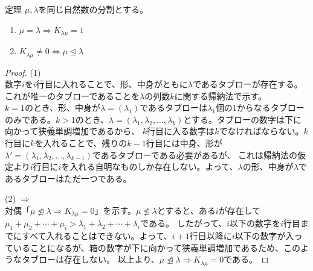 \documentclass[a4paper,11pt]{jsarticle}
\theoremstyle{plain}
\theoremstyle{definition}
\renewcommand{\(}{\left(}
\renewcommand{\)}{\right)}
\renewcommand{\[}{\left[}
\renewcommand{\]}{\right]}
\renewcommand{\{}{\left\lbrace}
\renewcommand{\}}{\right\rbrace}
\newcommand{\Iff}{\Longleftrightarrow}
\newcommand{\To}{\Longrightarrow}
\begin{document}
\begin{itembox}[l]{定理}
    $\mu, \lambda$を同じ自然数の分割とする。
    \begin{enumerate}[(1)]
        \item $\mu = \lambda \To K_{\lambda\mu } = 1$
        \item $K_{\lambda\mu } \neq 0 \Iff \mu \trianglelefteq \lambda$
    \end{enumerate}
\end{itembox}

\begin{proof}
    \subitem (1) \\
    数字$i$を$i$行目に入れることで、形、中身がともに$\lambda$であるタブローが存在する。
    これが唯一のタブローであることを$\lambda$の列数$k$に関する帰納法で示す。\\
    $k=1$のとき、形、中身が$\lambda = (\lambda_1)$であるタブローは$\lambda_1$個の$1$からなるタブローのみである。$k>1$のとき、$\lambda = (\lambda_1, \lambda_2, \ldots, \lambda_k)$とする。タブローの数字は下に向かって狭義単調増加であるから、
    $k$行目に入る数字は$k$でなければならない。$k$行目に$k$を入れることで、残りの$k-1$行目には中身、形が$\lambda' = (\lambda_1, \lambda_2, \ldots, \lambda_{k-1})$であるタブローである必要があるが、
    これは帰納法の仮定より$i$行目に$i$を入れる自明なものしか存在しない。よって、$\lambda$の形、中身が$\lambda$であるタブローはただ一つである。

    \subitem (2) $\To$ \\
    対偶「$\mu \not\trianglelefteq \lambda \To K_{\lambda\mu } = 0$」を示す。$\mu \not\trianglelefteq \lambda$とすると、ある$i$が存在して$\mu_1 + \mu_2 + \cdots + \mu_i > \lambda_1 + \lambda_2 + \cdots + \lambda_i$である。
    したがって、$i$以下の数字を$i$行目までにすべて入れることはできない。よって、$i+1$行目以降に$i$以下の数字が入っていることになるが、箱の数字が下に向かって狭義単調増加であるため、このようなタブローは存在しない。
    以上より、$\mu \not\trianglelefteq \lambda \To K_{\lambda\mu } = 0$である。


\end{proof}
\end{document}

